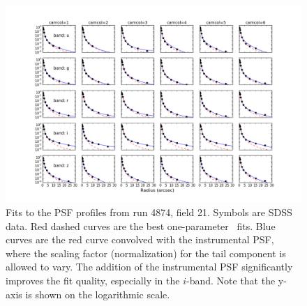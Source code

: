 \begin{figure}[th]
\centering
\includegraphics[width=1.0\textwidth]{FIGURES/psffit.png}
\vskip -0.3in
\caption{Fits to the PSF profiles from run 4874, field 21. Symbols are SDSS data. 
  Red dashed curves are the best one-parameter \vk~fits. Blue curves are the red
  curve convolved with the instrumental PSF, where the scaling factor (normalization) 
  for the tail component is allowed to vary. The addition of the instrumental PSF 
  significantly improves the fit quality, especially in the $i$-band. Note that the y-axis 
  is shown on the logarithmic scale.
\label{fig:psffit}}
\end{figure}


